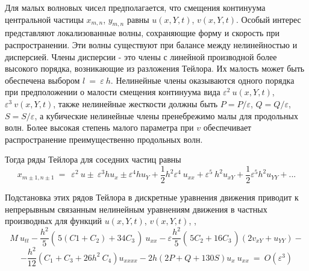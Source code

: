 Для малых волновых чисел предполагается, что смещения континуума центральной частицы $x_{m, n} $, $y_{m, n}$ равны $u(x, Y, t) $, $v(x, Y, t) $. Особый интерес представляют локализованные волны, сохраняющие форму и скорость при распространении. Эти волны существуют при балансе между нелинейностью и дисперсией. Члены дисперсии - это члены с линейной производной более высокого порядка, возникающие из разложения Тейлора. Их малость может быть обеспечена выбором $l ~ = ~ \varepsilon ~ h$. Нелинейные члены оказываются одного порядка при предположении о малости смещения континуума вида $\varepsilon^2 ~ u (x, Y, t) $, $\varepsilon ^ 3 ~ v (x, Y, t)$, также нелинейные жесткости должны быть $P = P / \varepsilon $, $ Q = Q / \varepsilon$, $ S = S / \varepsilon $, а кубические нелинейные члены пренебрежимо малы для продольных волн. Более высокая степень малого параметра при $v$ обеспечивает распространение преимущественно продольных волн.

Тогда ряды Тейлора для соседних частиц равны
\[
x_{m\pm1,n\pm1}~=~ ~\varepsilon^2~u\pm~\varepsilon^3 h u_x\pm \varepsilon^4 h u_Y+\frac{1}{2} h^2 \varepsilon^4~u_{xx}+ \varepsilon^5~ h^2 u_{xY}+\frac{1}{2}\varepsilon^5 h^2 u_{YY}+...
\]

Подстановка этих рядов Тейлора в дискретные уравнения движения приводит к непрерывным связанным нелинейным уравнениям движения в частных производных для функций $u(x, Y, t)$, $v(x, Y, t)$,  \cite{porkros},
\[
M~u_{tt}-\frac{h^2}{5}\left(\frac{}{} 5(C1+C_2)+34 C_3 \frac{}{}\right)~u_{xx}- \varepsilon \frac{h^2}{5}\left(\frac{}{}5C_2+16 C_3\frac{}{}\right)\left( 2v_{xY}+ u_{YY}\right)-
\]
\begin{equation}
	-\frac{h^2}{12} \left( C_1+C_3+26 h^2 ~C_4\right) u_{xxxx}-2h(2 P + Q + 130  S) u_x~ u_{xx}~=~O(\varepsilon^3)
	\label{nonlon1}
\end{equation}

